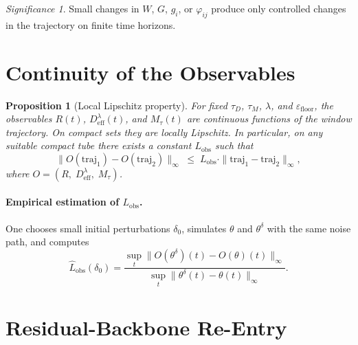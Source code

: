 \documentclass[11pt,a4paper]{article}
\theoremstyle{plain}
\newtheorem{proposition}[theorem]{Proposition}
\theoremstyle{definition}
\theoremstyle{remark}
\newtheorem*{significance}{Significance}
\newcommand{\Deff}{D_{\mathrm{eff}}}
\newcommand{\Mtau}{M_{\tau}}
\newcommand{\Lobs}{L_{\mathrm{obs}}}
\begin{document}
\begin{significance}
Small changes in $W$, $G$, $g_i$, or $\varphi_{ij}$ produce only controlled changes in the trajectory on finite time horizons.
\end{significance}


\section{Continuity of the Observables}

\begin{proposition}[Local Lipschitz property]
\label{prop:stetigkeit}
For fixed $\tau_D$, $\tau_M$, $\lambda$, and $\varepsilon_{\mathrm{floor}}$, the observables $R(t)$, $\Deff^{\lambda}(t)$, and $\Mtau(t)$ are continuous functions of the window trajectory. On compact sets they are locally Lipschitz. In particular, on any suitable compact tube there exists a constant $\Lobs$ such that
\begin{equation}
\label{eq:Lobs}
\|O(\mathrm{traj}_1) - O(\mathrm{traj}_2)\|_{\infty} \;\leq\; \Lobs \cdot \|\mathrm{traj}_1 - \mathrm{traj}_2\|_{\infty},
\end{equation}
where $O = (R,\;\Deff^{\lambda},\;\Mtau)$.
\end{proposition}

\paragraph{Empirical estimation of $\Lobs$.}
One chooses small initial perturbations $\delta_0$, simulates $\theta$ and $\theta^{\delta}$ with the same noise path, and computes
\begin{equation}
\hat{L}_{\mathrm{obs}}(\delta_0) = \frac{\sup_t \|O(\theta^{\delta})(t) - O(\theta)(t)\|_{\infty}}{\sup_t \|\theta^{\delta}(t) - \theta(t)\|_{\infty}}.
\end{equation}


\section{Residual-Backbone Re-Entry}
\end{document}
